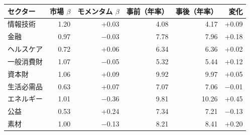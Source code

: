 \begin{tabular}{lrrrrr}
\toprule
セクター & 市場 $\beta$ & モメンタム $\beta$ & 事前（年率） & 事後（年率） & 変化 \\
\midrule
情報技術 & 1.20 & +0.03 & 4.08 & 4.17 & +0.09 \\
金融 & 0.97 & \ensuremath{-}0.03 & 7.78 & 7.96 & +0.18 \\
ヘルスケア & 0.72 & +0.06 & 6.34 & 6.36 & +0.02 \\
一般消費財 & 1.07 & \ensuremath{-}0.05 & 5.32 & 5.44 & +0.12 \\
資本財 & 1.06 & +0.09 & 9.92 & 9.97 & +0.05 \\
生活必需品 & 0.63 & +0.07 & 7.07 & 7.06 & \ensuremath{-}0.01 \\
エネルギー & 1.01 & \ensuremath{-}0.36 & 9.81 & 10.26 & +0.45 \\
公益 & 0.53 & +0.24 & 7.34 & 7.21 & \ensuremath{-}0.13 \\
素材 & 1.00 & \ensuremath{-}0.13 & 8.21 & 8.41 & +0.20 \\
\bottomrule
\end{tabular}
